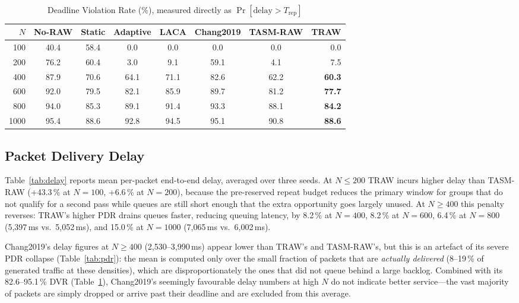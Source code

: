 \documentclass[journal]{IEEEtran}
\begin{document}
\begin{table}[!t]
\renewcommand{\arraystretch}{1.15}
\caption{Deadline Violation Rate (\%), measured directly as
$\Pr[\text{delay} > T_\mathrm{rep}]$}
\label{tab:dvr}
\centering
\setlength{\tabcolsep}{3.5pt}
\begin{tabular}{@{}rccccccr@{}}
\toprule
$N$ & No-RAW & Static & Adaptive & LACA & Chang2019 & TASM-RAW & \textbf{TRAW} \\
\midrule
 100 & 40.4 & 58.4 &  0.0 &  0.0 &  0.0 &  0.0 &  0.0 \\
 200 & 76.2 & 60.4 &  3.0 &  9.1 & 59.1 &  4.1 &  7.5 \\
 400 & 87.9 & 70.6 & 64.1 & 71.1 & 82.6 & 62.2 & \textbf{60.3} \\
 600 & 92.0 & 79.5 & 82.1 & 85.9 & 89.7 & 81.2 & \textbf{77.7} \\
 800 & 94.0 & 85.3 & 89.1 & 91.4 & 93.3 & 88.1 & \textbf{84.2} \\
1000 & 95.4 & 88.6 & 92.8 & 94.5 & 95.1 & 90.8 & \textbf{88.6} \\
\bottomrule
\end{tabular}
\end{table}

\subsection{Packet Delivery Delay}

Table~\ref{tab:delay} reports mean per-packet end-to-end delay,
averaged over three seeds.
At $N\!\leq\!200$ TRAW incurs higher delay than TASM-RAW
(+43.3\,\% at $N\!=\!100$, +6.6\,\% at $N\!=\!200$), because the
pre-reserved repeat budget reduces the primary window for groups that
do not qualify for a second pass while queues are still short enough
that the extra opportunity goes largely unused.
At $N\!\geq\!400$ this penalty reverses: TRAW's higher PDR drains
queues faster, reducing queuing latency, by 8.2\,\% at $N\!=\!400$,
8.2\,\% at $N\!=\!600$, 6.4\,\% at $N\!=\!800$ (5,397\,ms vs.\
5,052\,ms), and 15.0\,\% at $N\!=\!1000$ (7,065\,ms vs.\ 6,002\,ms).

Chang2019's delay figures at $N\!\geq\!400$ (2,530--3,990\,ms) appear
lower than TRAW's and TASM-RAW's, but this is an artefact of its
severe PDR collapse (Table~\ref{tab:pdr}): the mean is computed only
over the small fraction of packets that are \emph{actually delivered}
(8--19\,\% of generated traffic at these densities), which are
disproportionately the ones that did not queue behind a large backlog.
Combined with its 82.6--95.1\,\% DVR (Table~\ref{tab:dvr}), Chang2019's
seemingly favourable delay numbers at high $N$ do not indicate better
service---the vast majority of packets are simply dropped or arrive
past their deadline and are excluded from this average.
\end{document}

